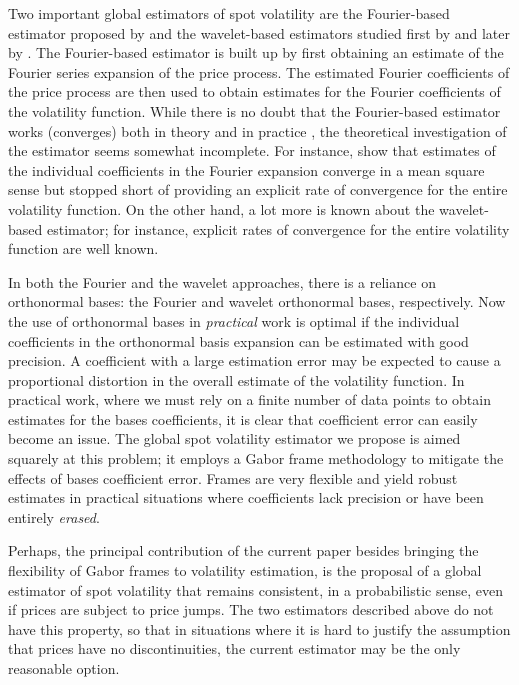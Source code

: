 \documentclass[a4paper, 12pt]{article}
\begin{document}
Two important global estimators  of spot volatility are  the Fourier-based estimator proposed by \cite{Malliavin2002} and the wavelet-based estimators studied  first by \cite{GenonCatalot1992} and later by \cite{Hoffmann2012}. The Fourier-based  estimator is built up  by first obtaining an estimate of  the Fourier series expansion  of the price process. The estimated Fourier coefficients of the price process are then used to obtain estimates for the Fourier coefficients of the volatility function. While there is no doubt that the Fourier-based estimator works (converges) both in theory and in practice \citep[See][]{Malliavin2007,Malliavin2009}, the theoretical investigation of the estimator seems somewhat incomplete.
For instance, \citeauthor{Malliavin2002} show that estimates of the individual coefficients  in the Fourier expansion converge in a mean square sense but  stopped short of providing an explicit rate of convergence for the entire volatility function. On the other hand,  a lot more is known about the wavelet-based estimator; for instance, explicit rates of convergence for the entire volatility function are  well known.  

In both the Fourier and the wavelet approaches, there is a reliance  on orthonormal bases: the Fourier and wavelet orthonormal bases, respectively.   Now the use of orthonormal bases  in \emph{practical} work is optimal  if  the  individual coefficients in the orthonormal basis expansion can be estimated with good precision. A coefficient with a large estimation error may be expected to cause a proportional distortion in the overall estimate of the volatility function. In practical work, where  we must rely on a finite  number of data points to obtain estimates for the bases coefficients, it is  clear that coefficient error can easily become an issue. The global spot volatility estimator we propose  is aimed squarely at this problem; it  employs a Gabor frame methodology to mitigate the effects of bases coefficient error. Frames are very flexible and yield robust estimates in practical situations where coefficients lack  precision or have been entirely \emph{erased}.  

Perhaps, the principal contribution of the current paper besides bringing the flexibility of Gabor frames to volatility estimation, is the proposal of a global estimator of spot volatility that remains consistent, in a probabilistic sense,  even if prices are subject to price jumps. The two estimators described above do not have this property, so that in situations where it is hard to justify the assumption that prices have no discontinuities,   the current estimator may be the only reasonable option.  
\end{document}
